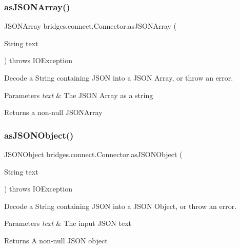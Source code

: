 \subsubsection{\texorpdfstring{as\+J\+S\+O\+N\+Array()}{asJSONArray()}}
{\footnotesize\ttfamily J\+S\+O\+N\+Array bridges.\+connect.\+Connector.\+as\+J\+S\+O\+N\+Array (\begin{DoxyParamCaption}\item[{String}]{text }\end{DoxyParamCaption}) throws I\+O\+Exception}

Decode a String containing J\+S\+ON into a J\+S\+ON Array, or throw an error. 
\begin{DoxyParams}{Parameters}
{\em text} & The J\+S\+ON Array as a string \\
\hline
\end{DoxyParams}
\begin{DoxyReturn}{Returns}
a non-\/null J\+S\+O\+N\+Array 
\end{DoxyReturn}
\hypertarget{classbridges_1_1connect_1_1_connector_aac3fb75dd7975c4439cfd1bf6cefe0a6}{}\label{classbridges_1_1connect_1_1_connector_aac3fb75dd7975c4439cfd1bf6cefe0a6} 
\subsubsection{\texorpdfstring{as\+J\+S\+O\+N\+Object()}{asJSONObject()}}
{\footnotesize\ttfamily J\+S\+O\+N\+Object bridges.\+connect.\+Connector.\+as\+J\+S\+O\+N\+Object (\begin{DoxyParamCaption}\item[{String}]{text }\end{DoxyParamCaption}) throws I\+O\+Exception}

Decode a String containing J\+S\+ON into a J\+S\+ON Object, or throw an error. 
\begin{DoxyParams}{Parameters}
{\em text} & The input J\+S\+ON text \\
\hline
\end{DoxyParams}
\begin{DoxyReturn}{Returns}
A non-\/null J\+S\+ON object 
\end{DoxyReturn}
\hypertarget{classbridges_1_1connect_1_1_connector_aabcfde23d155c8c42edb8a1407320bc5}{}\label{classbridges_1_1connect_1_1_connector_aabcfde23d155c8c42edb8a1407320bc5} 

